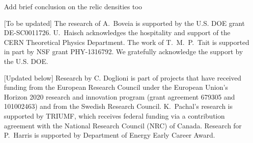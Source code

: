 \documentclass[a4paper, 11pt]{article}
\begin{document}
{\color{red}Add brief conclusion on the relic densities too}


\acknowledgments 

[To be updated] The research of A.~Boveia is supported by the U.S. DOE grant  DE-SC0011726. U.~Haisch acknowledges the hospitality and support of the CERN Theoretical Physics Department. The work of T.~M.~P.~Tait is supported in part by NSF grant PHY-1316792. We gratefully acknowledge the support by the U.S. DOE. 

[Updated below]
Research by C. Doglioni is part of projects that have received funding from the European Research Council under the European Union’s Horizon 2020 research and innovation program (grant agreement 679305 and 101002463) and from the Swedish Research Council.
K.~Pachal's research is supported by TRIUMF, which receives federal funding via a contribution agreement with the National Research Council (NRC) of Canada.
Research for P.~Harris is supported by Department of Energy Early Career Award. 








\end{document}

